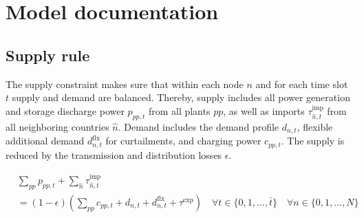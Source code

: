 \documentclass[]{article}
\begin{document}
%
%
%

\section{Model documentation}\label{model-documentation}

\subsection{Supply rule}\label{supply-rule}

The supply constraint makes sure that within each node $n$ and for each
time slot $t$ supply and demand are balanced. Thereby, supply includes
all power generation and storage discharge power $p_{pp,t}$ from all
plants $pp$, as well as imports $\tau^\mathrm{imp}_{\hat n,t}$ from all
neighboring countries $\hat n$. Demand includes the demand profile
$d_{n,t}$, flexible additional demand $d^\mathrm{flx}_{n,t}$ for
curtailments, and charging power $c_{pp,t}$. The supply is reduced by
the transmission and distribution losses $\epsilon$.

\[ \begin{aligned}
&\sum_{pp} p_{pp,t} + \sum_{\hat n}\tau^\mathrm{imp}_{\hat n,t}\\
&=\left(1-\epsilon\right) \left(\sum_{pp} c_{pp,t} + d_{n,t} + d^\mathrm{flx}_{n,t} + \tau^\mathrm{exp}\right) \quad \forall t \in \{0, 1, ..., \bar t\} \quad \forall n \in \{0,1,...,N\}
\end{aligned}
\]
\end{document}
